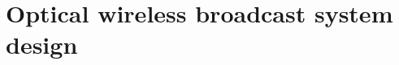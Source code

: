 \chapter{Optical wireless broadcast system design}
\label{chapter:system}
\thispagestyle{myheadings}

\graphicspath{{_System/Figures/}}

